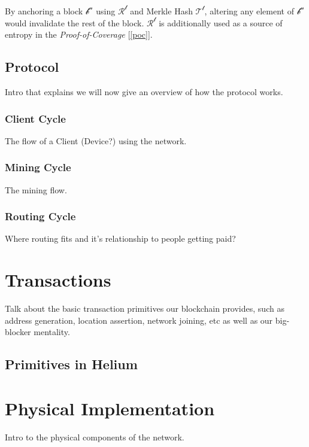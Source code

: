 \documentclass[letterpaper,11pt]{article}
\begin{document}
By anchoring a block $\mathcal{b^n}$ using $\mathcal{R^t}$ and Merkle Hash $\mathcal{T^t}$, altering any element of $\mathcal{b^n}$ would invalidate the rest of the block. $\mathcal{R^t}$ is additionally used as a source of entropy in the \textit{Proof-of-Coverage} [\ref{poc}]. 

\subsection{Protocol}

Intro that explains we will now give an overview of how the protocol works.

\subsubsection{Client Cycle}

The flow of a Client (Device?) using the network.

\subsubsection{Mining Cycle}

The mining flow.

\subsubsection{Routing Cycle}

Where routing fits and it's relationship to people getting paid?

\section{Transactions} \label{transactions}

Talk about the basic transaction primitives our blockchain provides, such as address generation, location assertion, network joining, etc as well as our big-blocker mentality.

\subsection{Primitives in Helium}

\section{Physical Implementation}

Intro to the physical components of the network.
\end{document}
